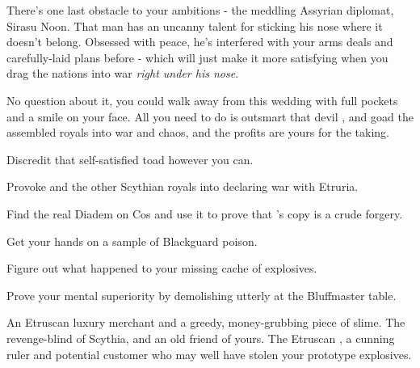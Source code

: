 \documentclass[char]{Kos}
\begin{document}
There's one last obstacle to your ambitions - the meddling Assyrian diplomat, Sirasu Noon. That man has an uncanny talent for sticking his nose where it doesn't belong. Obsessed with peace, he's interfered with your arms deals and carefully-laid plans before - which will just make it more satisfying when you drag the nations into war \emph{right under his nose}.

No question about it, you could walk away from this wedding with full pockets and a smile on your face. All you need to do is outsmart that devil \cMerchant{}, and goad the assembled royals into war and chaos, and the profits are yours for the taking.

\begin{itemz}[Goals]
\item Discredit that self-satisfied toad \cMerchant{} however you can.
\item Provoke \cScythiaQueen{\Monarch} \cScythiaQueen{} and the other Scythian royals into declaring war with Etruria.
\item Find the real Diadem on Cos and use it to prove that \cMerchant{}'s copy is a crude forgery.
\item Get your hands on a sample of Blackguard poison.
\item Figure out what happened to your missing cache of explosives.
\item Prove your mental superiority by demolishing \cMerchant{} utterly at the Bluffmaster table.
\end{itemz}

\begin{contacts}
\contact{\cMerchant{}} An Etruscan luxury merchant and a greedy, money-grubbing piece of slime.
\contact{\cScythiaQueen{}} The revenge-blind \cScythiaQueen{\monarch} of Scythia, and an old friend of yours.
\contact{\cEtruriaKing{}} The Etruscan \cEtruriaKing{\monarch}, a cunning ruler and potential customer who may well have stolen your prototype explosives.
\end{contacts}
\end{document}
